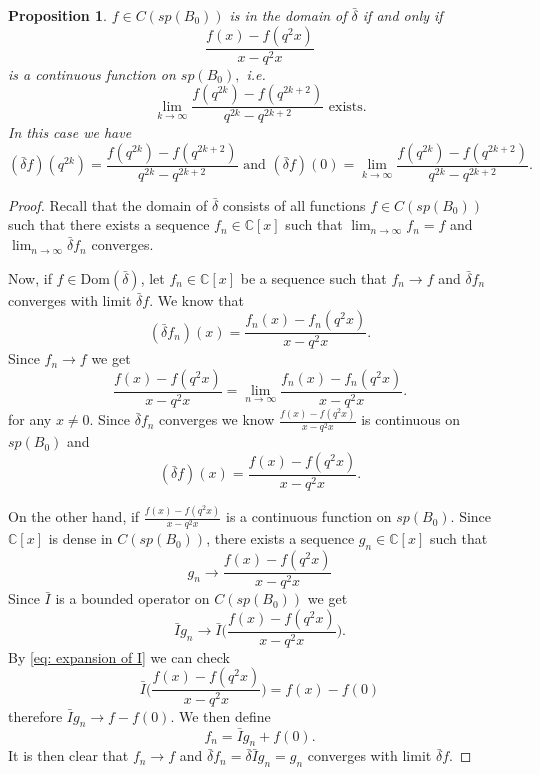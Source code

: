 \documentclass[12pt]{article}
\newtheorem{proposition}[definition]{Proposition}
\numberwithin{equation}{section}
\def\Dom{{\mathrm {Dom}}}
\def\db{\bar{\delta}}
\def\C{{\mathbb C}}
\def\I{\bar{I}}
\def\d{\bar{\delta}}
\begin{document}
\begin{proposition} \label{prop: delta_bar_domain}
    $f\in C(sp(B_0))$ is in the domain of $\d$ if and only if \[
    \frac{f(x)-f(q^2 x)}{x-q^2 x}
    \]
    is a continuous function on $sp(B_0),$ i.e.
    $$
    \lim_{k\to \infty}\frac{f(q^{2k})-f(q^{2k+2})}{q^{2k}-q^{2k+2}} \text{ exists.}
    $$
In this case we have  \begin{equation}
    (\db f)(q^{2k})=\frac{f(q^{2k})-f(q^{2k+2})}{q^{2k}-q^{2k+2}} \text{ and }(\db f)(0)= \lim_{k\to \infty}\frac{f(q^{2k})-f(q^{2k+2})}{q^{2k}-q^{2k+2}}.
\end{equation}
\end{proposition}
\begin{proof}
    Recall that the domain of $\d$ consists of all  functions $f\in C(sp(B_0))$ such that there exists a sequence $f_n\in \C[x]$ such that  $\lim_{n \to \infty} f_n = f$ and $\lim_{n \to \infty} \d f_n$ converges.
    
    Now, if $f\in \Dom (\db)$, let $f_n\in \C[x]$ be a sequence such that $f_n\to f$ and $\db f_n$ converges with limit $\db f$.  
    We know that 
    $$(\db f_n)(x)=\frac{f_n(x)-f_n(q^2 x)}{x-q^2 x}.$$
    Since $f_n\to f$ we get \[
    \frac{f(x)-f(q^2 x)}{x-q^2 x} = \lim_{n \to \infty} \frac{f_n(x)-f_n(q^2 x)}{x-q^2 x}.
    \]
    for any $x\neq 0$. Since $\db f_n$ converges we know $\frac{f(x)-f(q^2 x)}{x-q^2 x}$ is continuous on $sp(B_0)$ and 
    $$
    (\db f)(x)=\frac{f(x)-f(q^2 x)}{x-q^2 x}.
    $$

    On the other hand, if $\frac{f(x)-f(q^2 x)}{x-q^2 x}$ is a continuous function on $sp(B_0)$. Since $\C[x]$ is dense in $C(sp(B_0))$, there exists a sequence $g_n\in \C[x]$ such that
    $$g_n\to \frac{f(x)-f(q^2 x)}{x-q^2 x}$$
    Since $\I$ is a bounded operator on $C(sp(B_0))$ we get
    $$
   \I g_n\to\I \big(\frac{f(x)-f(q^2 x)}{x-q^2 x}\big).
    $$
    By \eqref{eq: expansion of I} we can check
    $$
    \I \big(\frac{f(x)-f(q^2 x)}{x-q^2 x}\big)=f(x)-f(0)
    $$
    therefore $\I g_n\to f-f(0)$. We then define
    $$f_n=\I g_n+f(0).
    $$
    It is then clear that $f_n\to f$ and $\db f_n=\db \I g_n=g_n$ converges with limit $\db f$.
\end{proof}
\end{document}

